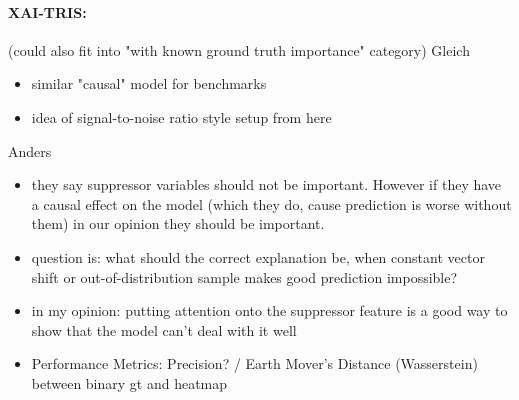 \paragraph*{XAI-TRIS:}
(could also fit into "with known ground truth importance" category)
\cite{Clark2023}
Gleich
\begin{itemize}
      \item similar "causal" model for benchmarks
      \item idea of signal-to-noise ratio style setup from here
\end{itemize}

Anders
\begin{itemize}
      \item they say suppressor variables should not be important. However if they have a causal effect on the model (which they do, cause prediction is worse without them) in our opinion they should be important.
      \item question is: what should the correct explanation be, when constant vector shift or out-of-distribution sample makes good prediction impossible?
      \item in my opinion: putting attention onto the suppressor feature is a good way to show that the model can't deal with it well
      \item Performance Metrics: Precision? / Earth Mover's Distance (Wasserstein) between binary gt and heatmap
\end{itemize}

